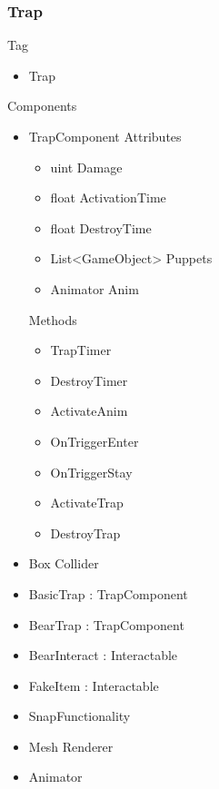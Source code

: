 \documentclass[11pt]{article}
\begin{document}
\subsubsection{Trap}
Tag
\begin{itemize}
	\item Trap
\end{itemize}
Components
\begin{itemize}
	\item TrapComponent
	\newline Attributes
	\begin{itemize}
		\item uint Damage
		\item float ActivationTime
		\item float DestroyTime
		\item List<GameObject> Puppets
		\item Animator Anim
	\end{itemize}
	Methods
	\begin{itemize}
		\item TrapTimer
		\item DestroyTimer
		\item ActivateAnim
		\item OnTriggerEnter
		\item OnTriggerStay
		\item ActivateTrap
		\item DestroyTrap
	\end{itemize}
	\item Box Collider
	\item BasicTrap : TrapComponent
	\item BearTrap : TrapComponent
	\item BearInteract : Interactable
	\item FakeItem : Interactable
	\item SnapFunctionality
	\item Mesh Renderer
	\item Animator
\end{itemize}

\newpage
\end{document}

